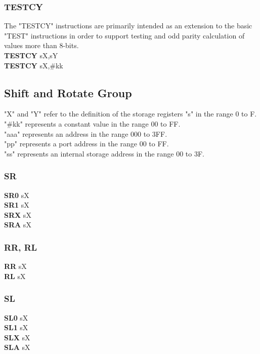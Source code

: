         \subsubsection{TESTCY}
            The "TESTCY" instructions are primarily intended as an extension to the basic "TEST" instructions in order to support testing and odd parity calculation of
            values more than 8-bits.\\
            \textbf{TESTCY} sX,sY\\
            \textbf{TESTCY} sX,\#kk\\
        \subsection{Shift and Rotate Group}
            "X" and "Y" refer to the definition of the storage registers "s" in the range 0 to F.\\
            "\#kk" represents a constant value in the range 00 to FF.\\
            "aaa" represents an address in the range 000 to 3FF.\\
            "pp" represents a port address in the range 00 to FF.\\
            "ss" represents an internal storage address in the range 00 to 3F.\\
                \subsubsection{SR}
                    \textbf{SR0} sX\\
                    \textbf{SR1} sX\\
                    \textbf{SRX} sX\\
                    \textbf{SRA} sX\\
                \subsubsection{RR, RL}
                    \textbf{RR}  sX\\
                    \textbf{RL}  sX\\
                \subsubsection{SL}
                    \textbf{SL0} sX\\
                    \textbf{SL1} sX\\
                    \textbf{SLX} sX\\
                    \textbf{SLA} sX\\
